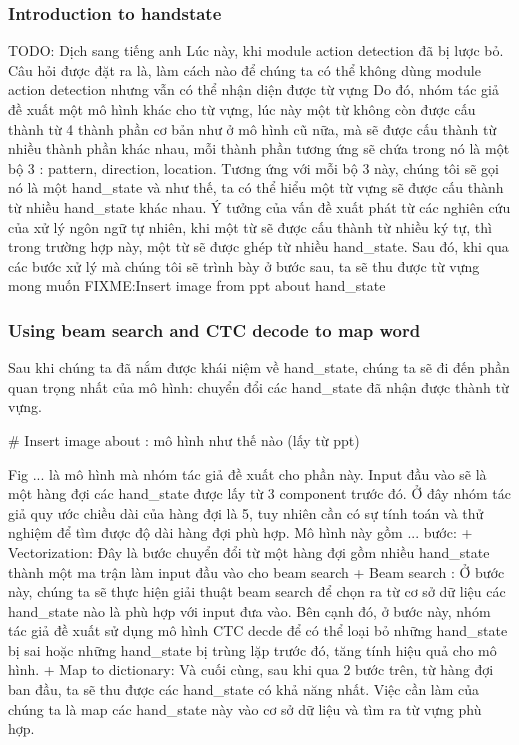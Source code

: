     \subsubsection{ Introduction to handstate }
      TODO: Dịch sang tiếng anh
      Lúc này, khi module action detection đã bị lược bỏ. Câu hỏi được đặt ra là,
      làm cách nào để chúng ta có thể không dùng module action detection nhưng vẫn có thể
      nhận diện được từ vựng
      Do đó, nhóm tác giả đề xuất một mô hình khác cho từ vựng, lúc này
      một từ không còn được cấu thành từ 4 thành phần cơ bản như ở mô hình cũ nữa,
      mà sẽ được cấu thành từ nhiều thành phần khác nhau, mỗi thành phần tương ứng
      sẽ chứa trong nó là một bộ 3 : pattern, direction, location. Tương ứng với mỗi
      bộ 3 này, chúng tôi sẽ gọi nó là một hand_state và như thế, ta có thể hiểu một từ vựng
      sẽ được cấu thành từ nhiều hand_state khác nhau. Ý tưởng của vấn đề xuất phát
      từ các nghiên cứu của xử lý ngôn ngữ tự nhiên, khi một từ sẽ được cấu thành từ
      nhiều ký tự, thì trong trường hợp này, một từ sẽ được ghép từ nhiều hand_state.
      Sau đó, khi qua các bước xử lý mà chúng tôi sẽ trình bày ở bước sau, ta sẽ thu được từ vựng mong muốn
      FIXME:Insert image from ppt about hand_state

    \subsubsection{ Using beam search and CTC decode to map word }
      Sau khi chúng ta đã nắm được khái niệm về hand_state, chúng ta sẽ đi đến phần quan trọng
      nhất của mô hình: chuyển đổi các hand_state đã nhận được thành từ vựng.
      
      # Insert image about : mô hình như thế nào (lấy từ ppt)

      Fig ... là mô hình mà nhóm tác giả đề xuất cho phần này. Input đầu vào
      sẽ là một hàng đợi các hand_state được lấy từ 3 component trước đó. Ở đây nhóm tác giả
      quy ước chiều dài của hàng đợi là 5, tuy nhiên cần có sự tính toán và thử nghiệm để tìm
      được độ dài hàng đợi phù hợp.
      Mô hình này gồm ... bước:
        + Vectorization: Đây là bước chuyển đổi từ một hàng đợi gồm nhiều hand_state thành
        một ma trận làm input đầu vào cho beam search
        + Beam search : Ở bước này, chúng ta sẽ thực hiện giải thuật beam search để chọn ra
        từ cơ sở dữ liệu các hand_state nào là phù hợp với input đưa vào. Bên cạnh đó, ở bước
        này, nhóm tác giả đề xuất sử dụng mô hình CTC decde để có thể loại bỏ những hand_state bị sai
        hoặc những hand_state bị trùng lặp trước đó, tăng tính hiệu quả cho mô hình.
        + Map to dictionary: Và cuối cùng, sau khi qua 2 bước trên, từ hàng đợi ban đầu, ta sẽ
        thu được các hand_state có khả năng nhất. Việc cần làm của chúng ta là map các hand_state
        này vào cơ sở dữ liệu và tìm ra từ vựng phù hợp.
      
